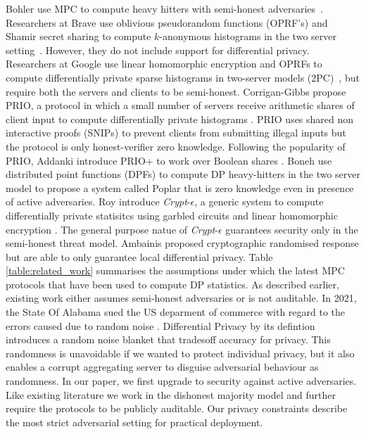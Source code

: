 Bohler \etal use MPC to compute heavy hitters with semi-honest adversaries~\cite{bohler2021secure}. 
Researchers at Brave use oblivious pseudorandom functions (OPRF's) \cite{jarecki2009efficient} and Shamir secret sharing \cite{shamir1979share} to compute $k$-anonymous histograms in the two server setting~\cite{davidson2021star}.  However, they do not include support for differential privacy. Researchers at Google use linear homomorphic encryption and OPRFs to compute differentially private sparse histograms in two-server models (2PC)~\cite{bell2022distributed}, but require both the servers and clients to be semi-honest.
Corrigan-Gibbs propose PRIO, a protocol in which a small number of servers receive arithmetic shares of client input to compute differentially private histograms \cite{corrigan-gibbs_prio_2017}. PRIO uses shared non interactive proofs (SNIPs) to prevent clients from submitting illegal inputs but the protocol is only honest-verifier zero knowledge. Following the popularity of PRIO, Addanki \etal introduce PRIO+ to work over Boolean shares \cite{addanki2022prio+}. Boneh \etal use distributed point functions (DPFs) \cite{boyle2019secure} to compute DP heavy-hitters in the two server model to propose a system called Poplar \cite{boneh_lightweight_2022} that is zero knowledge even in presence of active adversaries. Roy \etal introduce \textit{Crypt}-$\epsilon$, a generic system to compute differentially private statisitcs using garbled circuits and linear homomorphic encryption \cite{roy2020crypt}. The general purpose natue of \textit{Crypt}-$\epsilon$ guarantees security only in the semi-honest threat model. Ambainis \etal proposed cryptographic randomised response \cite{ambainis2004cryptographic} but are able to only guarantee local differential privacy. Table \ref{table:related_work} summarises the assumptions under which the latest MPC protocols that have been used to compute DP statistics. As described earlier, existing work either assumes semi-honest adversaries or is not auditable. In 2021, the State Of Alabama sued the US deparment of commerce with regard to the errors caused due to random noise \cite{courtCase}. Differential Privacy by its defintion introduces a random noise blanket that tradesoff accuracy for privacy. This randomness is unavoidable if we wanted to protect individual privacy, but it also enables a corrupt aggregating server to disguise adversarial behaviour as randomness. In our paper, we first upgrade to security against active adversaries. Like existing literature we work in the dishonest majority model and further require the protocols to be publicly auditable. Our privacy constraints describe the most strict adversarial setting for practical deployment.

